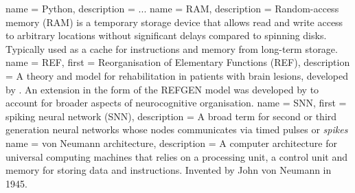  {
  name = Python,
  description = {...}
}
 {
  name = RAM,
  description = {Random-access memory (RAM) is a temporary storage device
	         that allows read and write access to arbitrary locations
		 without significant delays compared to spinning disks.
		 Typically used as a cache for instructions and memory
		 from long-term storage.}
}
 {
  name = REF,
  first = {Reorganisation of Elementary Functions (REF)},
  description = {A theory and model for rehabilitation in patients
  with brain lesions, developed by \cite{Mogensen2011}.
  An extension in the form of the REFGEN model was developed by
  \textcite{Mogensen2017} to account for broader aspects of
  neurocognitive organisation.}
}
 {
  name = SNN,
  first = {spiking neural network (SNN)},
  description = {A broad term for second or third generation neural
                 networks whose nodes communicates via timed pulses or
		 \textit{spikes}}
}
 {
  name = {von Neumann architecture},
  description = {A computer architecture for universal computing machines that
                 relies on a processing unit, a control unit and memory for
		 storing data and instructions. Invented by John von Neumann in
		 1945.}
}
